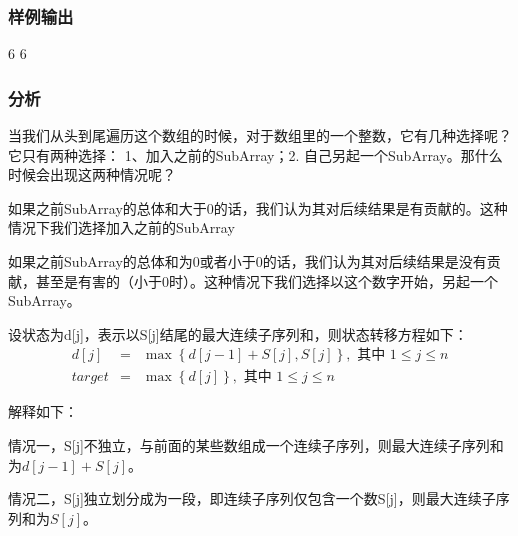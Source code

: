 \subsubsection{样例输出}
\begin{Code}
6
6
\end{Code}

\subsubsection{分析}
当我们从头到尾遍历这个数组的时候，对于数组里的一个整数，它有几种选择呢？它只有两种选择： 1、加入之前的SubArray；2. 自己另起一个SubArray。那什么时候会出现这两种情况呢？

如果之前SubArray的总体和大于0的话，我们认为其对后续结果是有贡献的。这种情况下我们选择加入之前的SubArray

如果之前SubArray的总体和为0或者小于0的话，我们认为其对后续结果是没有贡献，甚至是有害的（小于0时）。这种情况下我们选择以这个数字开始，另起一个SubArray。

设状态为d[j]，表示以S[j]结尾的最大连续子序列和，则状态转移方程如下：
\begin{eqnarray}
d[j] &=& \max\left\{d[j-1]+S[j],S[j]\right\}, \text{ 其中 }1 \leq j \leq n \nonumber \\
target &=& \max\left\{d[j]\right\}, \text{ 其中 }1 \leq j \leq n \nonumber
\end{eqnarray}

解释如下：
\begindot
\item 情况一，S[j]不独立，与前面的某些数组成一个连续子序列，则最大连续子序列和为$d[j-1]+S[j]$。
\item 情况二，S[j]独立划分成为一段，即连续子序列仅包含一个数S[j]，则最大连续子序列和为$S[j]$。
\myenddot    


